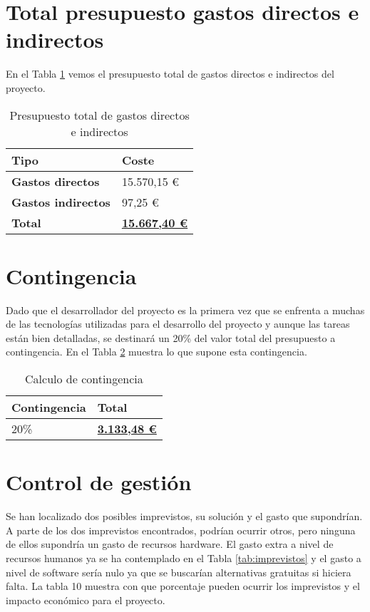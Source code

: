 \section{Total presupuesto gastos directos e indirectos}

En el Tabla \ref{tab:preptotaldirindi} vemos el presupuesto total de gastos directos e indirectos del proyecto.

\begin{table}[H]\label{tab:preptotaldirindi}
	\centering
	\begin{tabular}{|l|l|}
		\hline
		\textbf{Tipo}              & \textbf{Coste}                   \\ \hline
		\textbf{Gastos directos}   & 15.570,15 €                      \\ \hline
		\textbf{Gastos indirectos} & 97,25 €                          \\ \hline
		\textbf{Total}             & \textbf{\underline{15.667,40 €}} \\ \hline
	\end{tabular}
	\caption{Presupuesto total de gastos directos e indirectos}
\end{table}

\section{Contingencia}
Dado que el desarrollador del proyecto es la primera vez que se enfrenta a muchas de las tecnologías utilizadas para el desarrollo del proyecto y aunque las tareas están bien detalladas, se destinará un 20\% del valor total del presupuesto a contingencia. En el Tabla \ref{tab:contingencia} muestra lo que supone esta contingencia.

\begin{table}[H]\label{tab:contingencia}
	\centering
	\begin{tabular}{|l|l|}
		\hline
		\textbf{Contingencia} & \textbf{Total}                  \\ \hline
		20\%                  & \textbf{\underline{3.133,48 €}} \\ \hline
	\end{tabular}
	\caption{Calculo de contingencia}
\end{table}

\section{Control de gestión}
Se han localizado dos posibles imprevistos, su solución y el gasto que supondrían. A parte de los dos imprevistos encontrados, podrían ocurrir otros, pero ninguna de ellos supondría un gasto de recursos hardware. El gasto extra a nivel de recursos humanos ya se ha contemplado en el Tabla \ref{tab:imprevistos} y el gasto a nivel de software sería nulo ya que se buscarían alternativas gratuitas si hiciera falta. La tabla 10 muestra con que porcentaje pueden ocurrir los imprevistos y el impacto económico para el proyecto.

